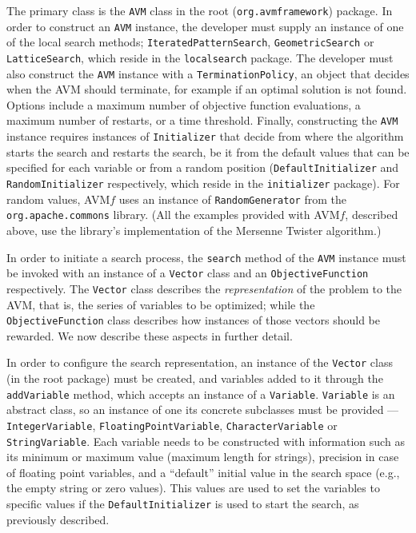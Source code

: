 \documentclass{llncs}
\newcommand{\name}{AVM\hspace{-1pt}$f$\xspace}
\newcommand{\inlineheading}[1]{\vspace{1ex} \noindent {\bf #1.}}
\begin{document}
\begin{sloppypar}
\inlineheading{Configuring an AVM search} The primary class is the {\tt AVM} class in the root ({\tt org.avmframework}) package. In order to construct an {\tt AVM} instance, the developer must supply an instance of one of the local search methods; {\tt IteratedPatternSearch}, {\tt GeometricSearch} or {\tt LatticeSearch}, which reside in the {\tt localsearch} package. The developer must also construct the {\tt AVM} instance with a {\tt TerminationPolicy}, an object that decides when the AVM should terminate, for example if an optimal solution is not found. Options include a maximum number of objective function evaluations, a maximum number of restarts, or a time threshold. Finally, constructing the {\tt AVM} instance requires instances of {\tt Initializer} that decide from where the algorithm starts the search and restarts the search, be it from the default values that can be specified for each variable or from a random position ({\tt DefaultInitializer} and {\tt RandomInitializer} respectively, which reside in the {\tt initializer} package). For random values, \name uses an instance of {\tt RandomGenerator} from the {\tt org.apache.commons} library. (All the examples provided with \name, described above, use the library's implementation of the Mersenne Twister algorithm.)
\end{sloppypar}

\begin{sloppypar}
In order to initiate a search process, the {\tt search} method of the {\tt AVM} instance must be invoked with an instance of a {\tt Vector} class and an {\tt ObjectiveFunction} respectively. The {\tt Vector} class describes the {\it representation} of the problem to the AVM, that is, the series of variables to be optimized; while the {\tt ObjectiveFunction} class describes how instances of those vectors should be rewarded. We now describe these aspects in further detail.
\end{sloppypar}

\begin{sloppypar}
\inlineheading{Representation} In order to configure the search representation, an instance of the {\tt Vector} class (in the root package) must be created, and variables added to it through the {\tt addVariable} method, which accepts an instance of a {\tt Variable}. {\tt Variable} is an abstract class, so an instance of one its concrete subclasses must be provided --- {\tt IntegerVariable}, {\tt FloatingPointVariable}, {\tt CharacterVariable} or {\tt StringVariable}. Each variable needs to be constructed with information such as its minimum or maximum value (maximum length for strings), precision in case of floating point variables, and a ``default'' initial value in the search space (e.g., the empty string or zero values). This values are used to set the variables to specific values if the {\tt DefaultInitializer} is used to start the search, as previously described.
\end{sloppypar}
\end{document}
